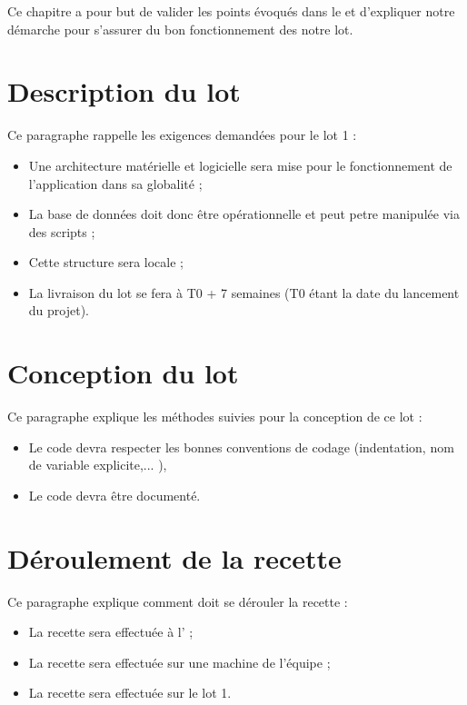 	Ce chapitre a pour but de valider les points évoqués dans le \DSE{} et d'expliquer notre démarche pour s'assurer du bon fonctionnement des notre lot.
	
\section{Description du lot}
	Ce paragraphe rappelle les exigences demandées pour le lot 1 :
	\begin{itemize}
		\item Une architecture matérielle et logicielle sera mise pour le fonctionnement de l'application dans sa globalité ;
		\item La base de données doit donc être opérationnelle et peut petre manipulée via des scripts ;
		\item Cette structure sera locale ;
		\item La livraison du lot se fera à T0 + 7 semaines (T0 étant la date du lancement du projet).
	\end{itemize}
	
\section{Conception du lot}
	Ce paragraphe explique les méthodes suivies pour la conception de ce lot :
	\begin{itemize}
		\item Le code devra respecter les bonnes conventions de codage (indentation, nom de variable explicite,... ),
		\item Le code devra être documenté.
	\end{itemize}
	
\section{Déroulement de la recette}
	Ce paragraphe explique comment doit se dérouler la recette : 
	\begin{itemize}
		\item La recette sera effectuée à l'\INSA{} ;
		\item La recette sera effectuée sur une machine de l'équipe \nomEquipe{} ;
		\item La recette sera effectuée sur le lot 1.
	\end{itemize}


